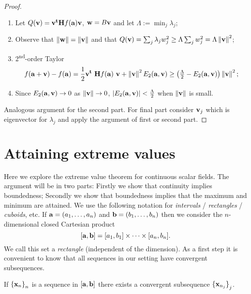 \begin{proof}
    \begin{enumerate}
        \item Let \(Q(\vv) =  \vv^{\mathbf{t}} \mathbf{H} f (\aa) \vv  \),  \(\ww = B \vv\) and let \(\Lambda := \min_j \lambda_j\);
        \item Observe that \(\norm{\ww} =  \norm{\vv}\) and that \(Q(\vv)=  \sum_{j} \lambda_j w_j^2  \geq \Lambda \sum_{j} w_j^2 = \Lambda  \norm{\vv}^2 \);
        \item 2\textsuperscript{nd}-order Taylor
              \vspace{-1em}
              \[
                  f(\aa+\vv) - f(\aa)
                  =  \frac{1}{2} \vv^{\mathbf{t}} \ \mathbf{H} f (\aa) \ \vv + \norm{\vv}^2 E_2(\aa,\vv)
                  \geq  \left(\tfrac{\Lambda}{2} - E_2(\aa,\vv) \right) \norm{\vv}^2;
              \]
        \item Since \(E_2(\aa,\vv) \to 0\) as \(\norm{\vv}\to 0\), \(\abs{E_2(\aa,\vv)} < \tfrac{\Lambda}{2}\) when \(\norm{\vv}\) is small.
    \end{enumerate}
    Analogous argument for the second part. For final part consider \(\vv_j\) which is eigenvector for \(\lambda_j\) and apply the argument of first or second part.
\end{proof}



\section{Attaining extreme values}

Here we explore the extreme value theorem for continuous scalar fields.
The argument will be in two parts:
Firstly we show that continuity implies boundedness;
Secondly we show that boundedness implies that the maximum and minimum are attained.
We use the following notation for \emph{intervals} / \emph{rectangles} / \emph{cuboids}, etc.
If \(\aa = (a_1,\ldots,a_n)\) and  \(\bb = (b_1,\ldots,b_n)\)
then we consider the \(n\)-dimensional closed Cartesian product
\[
    [\aa,\bb] = [a_1,b_1] \times \cdots \times [a_n,b_n].
\]
We call this set a \emph{rectangle} (independent of the dimension).
As a first step it is convenient to know that all sequences in our setting have convergent subsequences.

\begin{theorem}
    If \({\{\xx_{n}\}}_{n}\) is a sequence in \( [\aa,\bb]\)
    there exists a convergent subsequence \({\{\xx_{n_j}\}}_{j}\).
\end{theorem}


